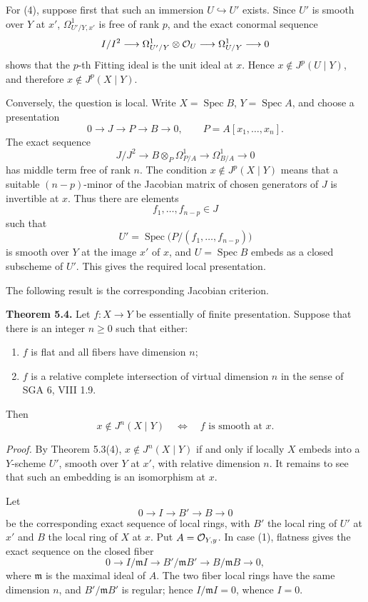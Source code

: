 \documentclass[11pt]{article}
\providecommand{\Spec}{\operatorname{Spec}}
\begin{document}
For (4), suppose first that such an immersion \(U\hookrightarrow U'\) exists.  Since \(U'\) is smooth over \(Y\) at \(x'\), \(\Omega^1_{U'/Y,x'}\) is free of rank \(p\), and the exact conormal sequence
\[
        I/I^2\longrightarrow
        \Omega^1_{U'/Y}\otimes\mathcal O_U\longrightarrow
        \Omega^1_{U/Y}\longrightarrow 0
\]
shows that the \(p\)-th Fitting ideal is the unit ideal at \(x\).  Hence \(x\notin J^p(U\mid Y)\), and therefore \(x\notin J^p(X\mid Y)\).

Conversely, the question is local.  Write \(X=\Spec B\), \(Y=\Spec A\), and choose a presentation
\[
        0\longrightarrow J\longrightarrow P\longrightarrow B\longrightarrow 0,
        \qquad
        P=A[x_1,\ldots,x_n].
\]
The exact sequence
\[
        J/J^2\longrightarrow B\otimes_P\Omega^1_{P/A}
        \longrightarrow \Omega^1_{B/A}\longrightarrow 0
\]
has middle term free of rank \(n\).  The condition \(x\notin J^p(X\mid Y)\) means that a suitable \((n-p)\)-minor of the Jacobian matrix of chosen generators of \(J\) is invertible at \(x\).  Thus there are elements
\[
        f_1,\ldots,f_{n-p}\in J
\]
such that
\[
        U'=\Spec\bigl(P/(f_1,\ldots,f_{n-p})\bigr)
\]
is smooth over \(Y\) at the image \(x'\) of \(x\), and \(U=\Spec B\) embeds as a closed subscheme of \(U'\).  This gives the required local presentation.

The following result is the corresponding Jacobian criterion.

\textbf{Theorem 5.4.}  Let \(f:X\to Y\) be essentially of finite presentation.  Suppose that there is an integer \(n\geq 0\) such that either:
\begin{enumerate}[label=(\arabic*)]
\item \(f\) is flat and all fibers have dimension \(n\);
\item \(f\) is a relative complete intersection of virtual dimension \(n\) in the sense of SGA 6, VIII 1.9.
\end{enumerate}
Then
\[
        x\notin J^n(X\mid Y)
        \quad\Longleftrightarrow\quad
        f\text{ is smooth at }x.
\]

\emph{Proof.}  By Theorem 5.3(4), \(x\notin J^n(X\mid Y)\) if and only if locally \(X\) embeds into a \(Y\)-scheme \(U'\), smooth over \(Y\) at \(x'\), with relative dimension \(n\).  It remains to see that such an embedding is an isomorphism at \(x\).

Let
\[
        0\longrightarrow I\longrightarrow B'\longrightarrow B\longrightarrow 0
\]
be the corresponding exact sequence of local rings, with \(B'\) the local ring of \(U'\) at \(x'\) and \(B\) the local ring of \(X\) at \(x\).  Put \(A=\mathcal O_{Y,y}\).  In case (1), flatness gives the exact sequence on the closed fiber
\[
        0\longrightarrow I/\mathfrak m I
        \longrightarrow B'/\mathfrak mB'
        \longrightarrow B/\mathfrak mB
        \longrightarrow 0,
\]
where \(\mathfrak m\) is the maximal ideal of \(A\).  The two fiber local rings have the same dimension \(n\), and \(B'/\mathfrak mB'\) is regular; hence \(I/\mathfrak m I=0\), whence \(I=0\).
\end{document}
